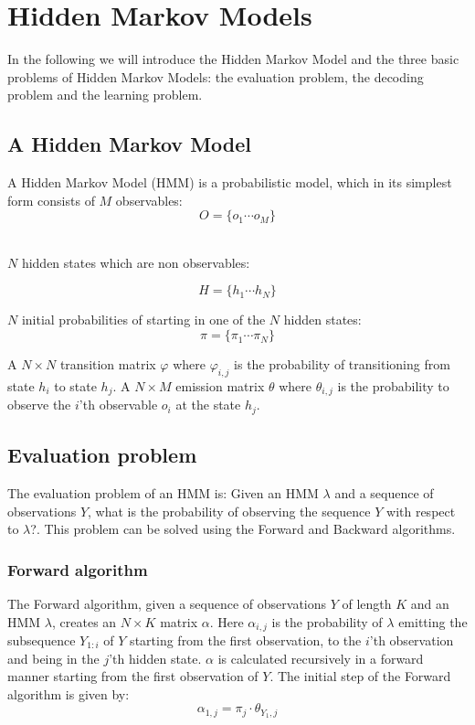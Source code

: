 \section{Hidden Markov Models}\label{sec:HMM}

In the following we will introduce the Hidden Markov Model and the three basic problems of Hidden Markov Models: the evaluation problem, the decoding problem and the learning problem.

\subsection{A Hidden Markov Model}

A Hidden Markov Model (HMM) is a probabilistic model, which in its simplest form consists of $M$ observables:
$$O = \{o_1\cdots o_M\}$$\

$N$ hidden states which are non observables:


$$H= \{h_1\cdots h_N\}$$

$N$ initial probabilities of starting in one of the $N$ hidden states:
$$\pi = \{\pi_1\cdots\pi_N\}$$

A $ N \times N $ transition matrix $\varphi$ where $\varphi_{i,j}$ is the probability of transitioning from state $h_i$ to state $h_j$. A $ N \times M $ emission matrix $\theta$ where $\theta_{i,j}$ is the probability to observe the $i$'th observable $o_i$ at the state $h_j$. 

\subsection{Evaluation problem}

The evaluation problem of an HMM is: Given an HMM $\lambda$ and a sequence of observations $Y$, what is the probability of observing the sequence $Y$ with respect to $\lambda$?. This problem can be solved using the Forward and Backward algorithms.

\subsubsection{Forward algorithm}\label{sec:forward}

The Forward algorithm\cite{Bishop}, given a sequence of observations $Y$ of length $K$ and an HMM $\lambda$, creates an $ N \times K$ matrix $\alpha$. Here $\alpha_{i,j}$ is the probability of $\lambda$ emitting the subsequence $Y_{1:i}$ of $Y$ starting from the first observation, to the $i$'th observation and being in the $j$'th hidden state. $\alpha$ is calculated recursively in a forward manner starting from the first observation of $Y$. 
The initial step of the Forward algorithm is given by:
$$\alpha_{1,j} = \pi_j\cdot\theta_{Y_1,j}$$

